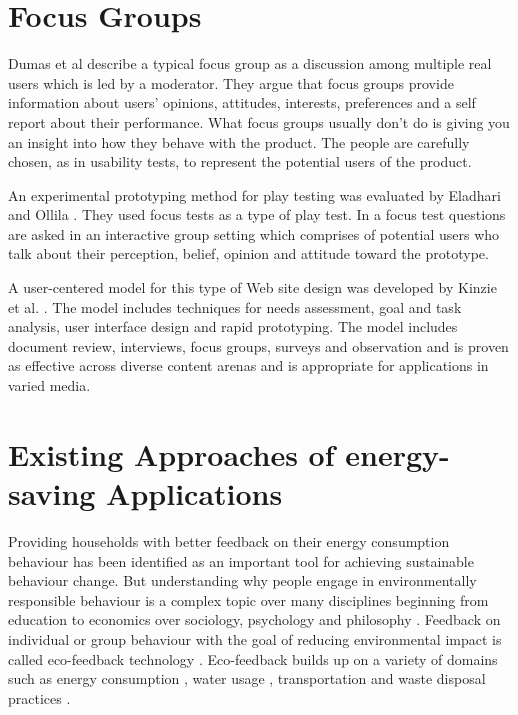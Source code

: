 \section{Focus Groups}

Dumas et al \cite{dumas1999practical} describe a typical focus group as a discussion among multiple real users which is led by a moderator. They argue that focus groups provide information about users' opinions, attitudes, interests, preferences and a self report about their performance. What focus groups usually don't do is giving you an insight into how they behave with the product. The people are carefully chosen, as in usability tests, to represent the potential users of the product.

An experimental prototyping method for play testing was evaluated by Eladhari and Ollila \cite{eladhari2012design}. They used focus tests as a type of play test. In a focus test questions are asked in an interactive group setting which comprises of potential users who talk about their perception, belief, opinion and attitude toward the prototype.

A user-centered model for this type of Web site design was developed by Kinzie et al. \cite{kinzie2002user}. The model includes techniques for needs assessment, goal and task analysis, user interface design and rapid prototyping. The model includes document
review, interviews, focus groups, surveys and observation and is proven as effective across diverse content arenas and is appropriate for applications in varied media.

\section{Existing Approaches of energy-saving Applications}

Providing households with better feedback on their energy consumption behaviour has been identified as an important tool for achieving sustainable behaviour change. But understanding why people engage in environmentally responsible behaviour is a complex topic over many disciplines beginning from education to economics over sociology, psychology and philosophy \cite{froehlich2010design}. Feedback on individual or group behaviour with the goal of reducing environmental impact is called eco-feedback technology \cite{mccalley1998computer, holstius2004infotropism, froehlich2010design}. Eco-feedback builds up on a variety of domains such as energy consumption \cite{holmes2007eco}, water usage \cite{arroyo2005waterbot}, transportation \cite{froehlich2009ubigreen, tulusan2012providing} and waste disposal practices \cite{holstius2004infotropism}.

